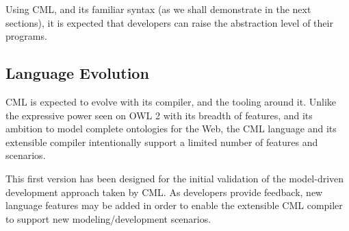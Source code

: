 Using CML,
and its familiar syntax (as we shall demonstrate in the next sections),
it is expected that developers can raise the abstraction level of their programs.

\subsection{Language Evolution}

CML is expected to evolve with its compiler, and the tooling around it.
Unlike the expressive power seen on OWL 2 \cite{owl2} with its breadth of features,
and its ambition to model complete ontologies for the Web,
the CML language and its extensible compiler intentionally support a limited number of features and scenarios.

This first version has been designed for the initial validation of the model-driven development approach taken by CML.
As developers provide feedback,
new language features may be added in order to enable the extensible CML compiler to support new modeling/development scenarios.

